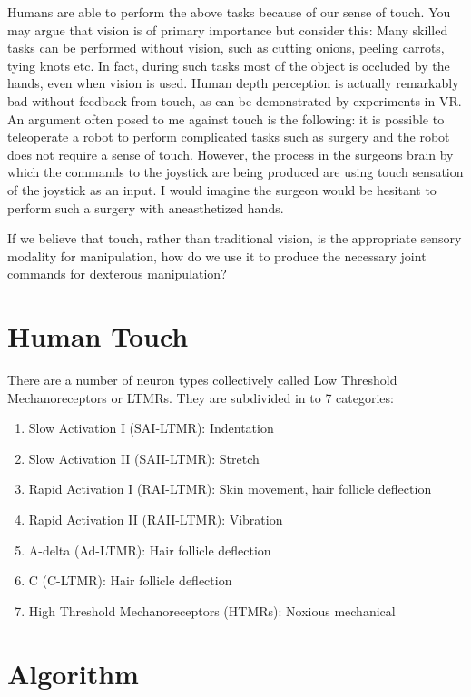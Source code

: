 \documentclass[12pt, letterpaper, twoside]{article}
\theoremstyle{definition}
\begin{document}
Humans are able to perform the above tasks because of our sense of touch.
You may argue that vision is of primary importance but consider this:
Many skilled tasks can be performed without vision, such as cutting onions,
peeling carrots, tying knots etc. In fact, during such tasks most of the object
is occluded by the hands, even when vision is used. Human depth
perception is actually remarkably bad without feedback from touch, as can
be demonstrated by experiments in VR. An argument often posed to me
against touch is the following: it is possible to teleoperate a robot to
perform complicated tasks such as surgery and the robot does not require
a sense of touch. However, the process in the surgeons brain
by which the commands to the joystick are being produced are using
touch sensation of the joystick as an input. I would imagine the surgeon
would be hesitant to perform such a surgery with aneasthetized hands.

If we believe that touch, rather than traditional vision, is the appropriate
sensory modality for manipulation, how do we use it to produce the necessary
joint commands for dexterous manipulation?

\section{Human Touch}
There are a number of neuron types collectively called Low Threshold Mechanoreceptors
or LTMRs. They are subdivided in to 7 categories:
\begin{enumerate}
\item Slow Activation I (SAI-LTMR): Indentation
\item Slow Activation II (SAII-LTMR): Stretch
\item Rapid Activation I (RAI-LTMR): Skin movement, hair follicle deflection
\item Rapid Activation II (RAII-LTMR): Vibration
\item A-delta (Ad-LTMR): Hair follicle deflection
\item C (C-LTMR): Hair follicle deflection
\item High Threshold Mechanoreceptors (HTMRs): Noxious mechanical
\end{enumerate}

\section{Algorithm}
\end{document}
